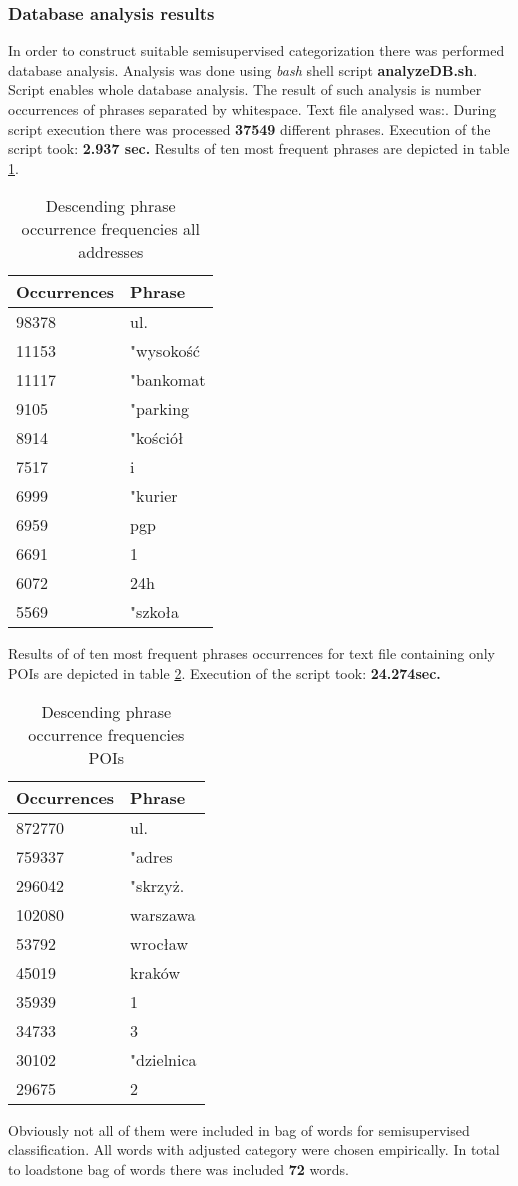 \subsubsection{Database analysis results}
In order to construct suitable semisupervised categorization there was performed database analysis. Analysis was done using \textit{bash} shell script \textbf{analyzeDB.sh}. Script enables whole database analysis. The result of such analysis is number occurrences of phrases separated by whitespace. Text file analysed was:\cite{29}. During script execution there was processed \textbf{37549} different phrases. Execution of the script took: \textbf{2.937 sec.} Results of ten most frequent phrases are depicted in table \ref{tab1}.
\begin{table}[H]
	\begin{tabular}{ | l | l |}
		\hline
		Occurrences & Phrase\tabularnewline \hline
		98378 & ul.	\\
		11153 & "wysokość\\
		11117 & "bankomat\\
		9105  & "parking\\
		8914  & "kościół\\
		7517  & i\\
		6999  & "kurier\\
		6959  & pgp\\
		6691  & 1 \\
		6072  & 24h\\
		5569  & "szkoła\\		
		\hline
	\end{tabular}
	\caption{Descending phrase occurrence frequencies all addresses}
	\label{tab1}
\end{table}
Results of of ten most frequent phrases occurrences for text file containing only POIs are depicted in table \ref{tab2}. Execution of the script took: \textbf{24.274sec.}
\begin{table}[H]
	\begin{tabular}{ | l | l |}
		\hline
		Occurrences & Phrase\\ \hline		
		872770& ul.\\
		759337& "adres\\
		296042& "skrzyż.\\
		102080& warszawa\\
		53792& wrocław\\
		45019& kraków\\
		35939& 1\\
		34733& 3\\
		30102& "dzielnica\\
		29675& 2	\\	
		\hline
	\end{tabular}
	\caption{Descending phrase occurrence frequencies POIs}
	\label{tab2}
\end{table}
Obviously not all of them were included in bag of words for semisupervised classification. All words with adjusted category were chosen empirically. In total to loadstone bag of words there was included \textbf{72} words.
